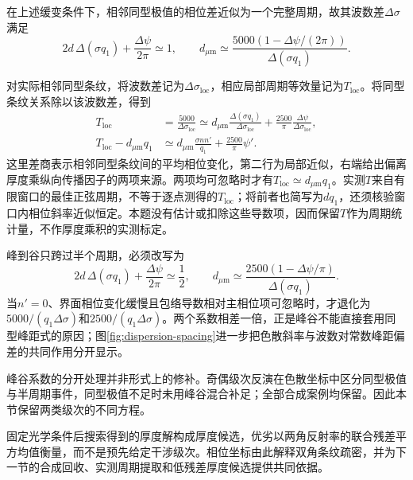 \begin{samepage}
在上述缓变条件下，相邻同型极值的相位差近似为一个完整周期，故其波数差$\Delta\sigma$满足
\begin{equation}
2d\,\Delta(\sigma q_1)+\frac{\Delta\psi}{2\pi}\simeq1,\qquad
d_{\mu\mathrm{m}}\simeq\frac{5000\left(1-\Delta\psi/(2\pi)\right)}{\Delta(\sigma q_1)}.
\end{equation}
\end{samepage}
对实际相邻同型条纹，将波数差记为$\Delta\sigma_{\mathrm{loc}}$，相应局部周期等效量记为$T_{\mathrm{loc}}$。将同型条纹关系除以该波数差，得到
\begin{equation}
\begin{aligned}
T_{\mathrm{loc}}&=\frac{5000}{\Delta\sigma_{\mathrm{loc}}}\simeq
d_{\mu\mathrm{m}}\frac{\Delta(\sigma q_1)}{\Delta\sigma_{\mathrm{loc}}}
+\frac{2500}{\pi}\frac{\Delta\psi}{\Delta\sigma_{\mathrm{loc}}},\\
T_{\mathrm{loc}}-d_{\mu\mathrm{m}}q_1&\simeq
d_{\mu\mathrm{m}}\frac{\sigma nn'}{q_1}+\frac{2500}{\pi}\psi'.
\end{aligned}
\label{eq:period-equivalent}
\end{equation}
这里差商表示相邻同型条纹间的平均相位变化，第二行为局部近似，右端给出偏离厚度乘纵向传播因子的两项来源。两项均可忽略时才有$T_{\mathrm{loc}}\simeq d_{\mu\mathrm{m}}q_1$。实测$T$来自有限窗口的最佳正弦周期，不等于逐点测得的$T_{\mathrm{loc}}$；将前者也简写为$dq_1$，还须核验窗口内相位斜率近似恒定。本题没有估计或扣除这些导数项，因而保留$T$作为周期统计量，不作厚度乘积的实测标定。

峰到谷只跨过半个周期，必须改写为
\begin{equation}
2d\,\Delta(\sigma q_1)+\frac{\Delta\psi}{2\pi}\simeq\frac12,\qquad
d_{\mu\mathrm{m}}\simeq\frac{2500\left(1-\Delta\psi/\pi\right)}{\Delta(\sigma q_1)}.
\end{equation}
当$n'=0$、界面相位变化缓慢且包络导数相对主相位项可忽略时，才退化为$5000/(q_1\Delta\sigma)$和$2500/(q_1\Delta\sigma)$。两个系数相差一倍，正是峰谷不能直接套用同型峰距式的原因；图\ref{fig:dispersion-spacing}进一步把色散斜率与波数对常数峰距偏差的共同作用分开显示。



峰谷系数的分开处理并非形式上的修补。奇偶级次反演在色散坐标中区分同型极值与半周期事件，同型极值不足时未用峰谷混合补足；全部合成案例均保留。因此本节保留两类级次的不同方程。

固定光学条件后搜索得到的厚度解构成厚度候选，优劣以两角反射率的联合残差平方均值衡量，而不是预先给定干涉级次。相位坐标由此解释双角条纹疏密，并为下一节的合成回收、实测周期提取和低残差厚度候选提供共同依据。
